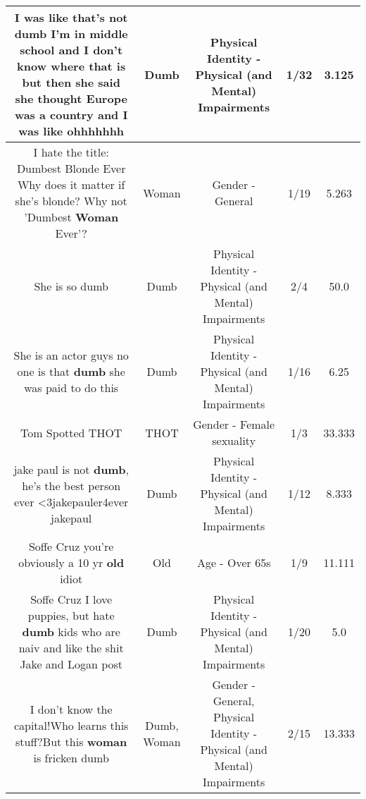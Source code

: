 \documentclass[11pt]{article}
\newlength\mylength
\begin{document}
\begin{center}
\begin{longtable}{|C{.65\mylength}|C{.30\mylength}|C{.12\mylength}|C{.12\mylength}|C{.12\mylength}|}
  \small I was like that's not \textbf{dumb} I'm in middle school and I don't know where that is but then she said she thought Europe was a country and I was like ohhhhhhh\normalsize   & Dumb & Physical Identity - Physical (and Mental) Impairments & 1/32 & 3.125 \\  \hline
  \small I hate the title: Dumbest Blonde Ever Why does it matter if she's blonde? Why not 'Dumbest \textbf{Woman} Ever'?\normalsize   & Woman & Gender - General & 1/19 & 5.263 \\  \hline
  \small She is so dumb\normalsize   & Dumb & Physical Identity - Physical (and Mental) Impairments & 2/4 & 50.0 \\  \hline
  \small She is an actor guys no one is that \textbf{dumb} she was paid to do this\normalsize   & Dumb & Physical Identity - Physical (and Mental) Impairments & 1/16 & 6.25 \\  \hline
  \small Tom Spotted THOT\normalsize   & THOT & Gender - Female sexuality & 1/3 & 33.333 \\  \hline
  \small jake paul is not \textbf{dumb}, he's the best person ever <3jakepauler4ever jakepaul\normalsize   & Dumb & Physical Identity - Physical (and Mental) Impairments & 1/12 & 8.333 \\  \hline
  \small Soffe Cruz you're obviously a 10 yr \textbf{old} idiot\normalsize   & Old & Age - Over 65s & 1/9 & 11.111 \\  \hline
  \small Soffe Cruz I love puppies, but hate \textbf{dumb} kids who are naiv and like the shit Jake and Logan post\normalsize   & Dumb & Physical Identity - Physical (and Mental) Impairments & 1/20 & 5.0 \\  \hline
  \small I don't know the capital!Who learns this stuff?But this \textbf{woman} is fricken dumb\normalsize   & Dumb, Woman & Gender - General, Physical Identity - Physical (and Mental) Impairments & 2/15 & 13.333 \\  \hline

\end{longtable}
\end{center}
\end{document}
